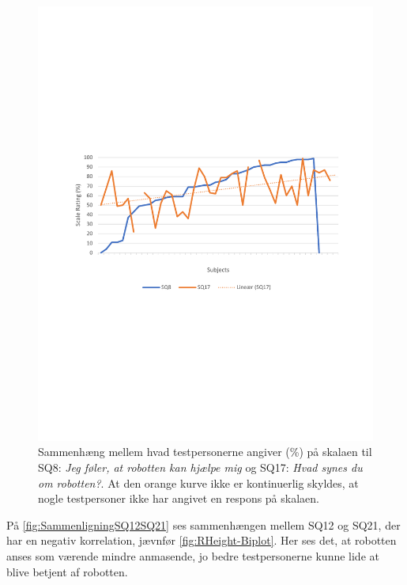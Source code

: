 \begin{figure}[H]
	\centering
	\includegraphics[width=\textwidth]{Figure/Korrelationsgrafer/SQ8+SQ17}
	\caption{Sammenhæng mellem hvad testpersonerne angiver (\%) på skalaen til SQ8: \textit{Jeg føler, at robotten kan hjælpe mig} og SQ17: \textit{Hvad synes du om robotten?}. At den orange kurve ikke er kontinuerlig skyldes, at nogle testpersoner ikke har angivet en respons på skalaen.}
	\label{fig:SammenligningSQ8SQ17}
\end{figure}
\noindent
%
På \autoref{fig:SammenligningSQ12SQ21} ses sammenhængen mellem SQ12 og SQ21, der har en negativ korrelation, jævnfør \autoref{fig:RHeight-Biplot}. Her ses det, at robotten anses som værende mindre anmasende, jo bedre testpersonerne kunne lide at blive betjent af robotten.
%
